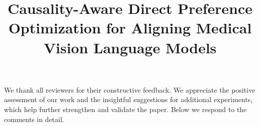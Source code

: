 \documentclass[10pt,twocolumn,letterpaper]{article}
\begin{document}
\title{Causality-Aware Direct Preference Optimization for Aligning Medical Vision Language Models}  %

\maketitle
\thispagestyle{empty}
\appendix

\noindent

We thank all reviewers for their constructive feedback. We appreciate the positive assessment of our work and the insightful suggestions for additional experiments, which help further strengthen and validate the paper. Below we respond to the comments in detail.
\end{document}

